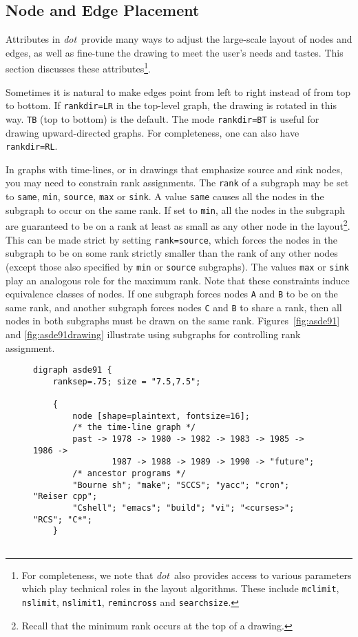 \documentclass[11pt]{article}
\def\dot{{\it dot}}
\begin{document}
{\subsection{Node and Edge Placement}

Attributes in \dot\ provide many ways to adjust the large-scale
layout of nodes and edges, as well as fine-tune the drawing to
meet the user's needs and tastes. This section discusses these
attributes\footnote{For completeness, we note that \dot\ also provides 
access to various parameters which play technical roles in the 
layout algorithms. These include {\tt mclimit}, 
{\tt nslimit}, {\tt nslimit1}, {\tt remincross} and {\tt searchsize}.}.

Sometimes it is natural to make edges point from left to right
instead of from top to bottom.
If \verb"rankdir=LR" in the top-level graph, the drawing is rotated
in this way.  \verb"TB" (top to bottom) is the default. The mode
\verb"rankdir=BT" is useful for drawing upward-directed graphs.
For completeness, one can also have \verb"rankdir=RL".

In graphs with time-lines, or in drawings that emphasize source and sink nodes,
you may need to constrain rank assignments.
The \verb"rank" of a subgraph may be set to {\tt same}, {\tt min}, 
{\tt source}, {\tt max} or {\tt sink}.
A value {\tt same} causes all the nodes in the subgraph to occur
on the same rank. If set to {\tt min}, all the nodes in the subgraph
are guaranteed to be on a rank at least as small as any other node in the
layout\footnote{Recall that the minimum rank occurs at the top of a drawing.}.
This can be made strict by setting {\tt rank=source}, which
forces the nodes in the subgraph to be on some rank strictly smaller
than the rank of any other nodes (except those also specified by 
{\tt min} or {\tt source} subgraphs).
The values {\tt max} or {\tt sink} play an analogous role for the
maximum rank.
Note that these constraints induce equivalence classes of nodes. If one
subgraph forces nodes {\tt A} and {\tt B} to be on the same rank, and
another subgraph forces nodes {\tt C} and {\tt B} to share a rank, then
all nodes in both subgraphs must be drawn on the same rank.
Figures~\ref{fig:asde91} and \ref{fig:asde91drawing}
illustrate using subgraphs for controlling rank assignment.

\begin{figure}[p]
\scriptsize
\begin{verbatim}
digraph asde91 {
    ranksep=.75; size = "7.5,7.5";

    {
        node [shape=plaintext, fontsize=16];
        /* the time-line graph */
        past -> 1978 -> 1980 -> 1982 -> 1983 -> 1985 -> 1986 ->
                1987 -> 1988 -> 1989 -> 1990 -> "future";
        /* ancestor programs */
        "Bourne sh"; "make"; "SCCS"; "yacc"; "cron"; "Reiser cpp";
        "Cshell"; "emacs"; "build"; "vi"; "<curses>"; "RCS"; "C*";
    }


\end{verbatim}
\end{figure}}
\end{document}
